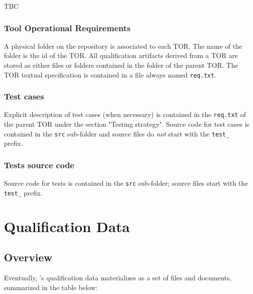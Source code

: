 \documentclass {report}
\begin{document}
TBC

\subsection{Tool Operational Requirements}
A physical folder on the repository is associated to each TOR. The name of the folder is the id of the TOR. All qualification artifacts derived from a TOR are stored as either files or folders contained in the folder of the parent TOR. The TOR textual specification is contained in a file always named \texttt{req.txt}.

\subsection{Test cases}
Explicit description of test cases (when necessary) is contained in the \texttt{req.txt} of the parent TOR under the section "Testing strategy". Source code for test cases is contained in the \texttt{src} sub-folder and source files do \emph{not} start with the \texttt{test\_} prefix. 

\subsection{Tests source code}
Source code for tests is contained in the \texttt{src} sub-folder; source files start with the \texttt{test\_} prefix. 


\chapter{Qualification Data}

\section{Overview}
\label{sec:qd-overview}

Eventually, \xcov{}'s qualification data materializes as a set of files and
documents, summarized in the table below:
\end{document}
